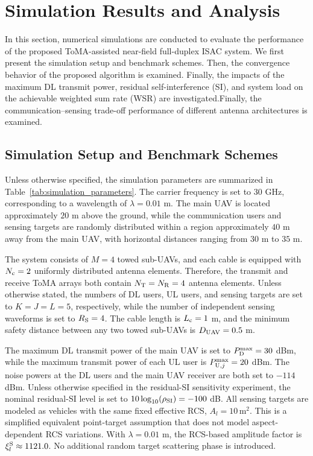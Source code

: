 \documentclass[letterpaper,journal]{IEEEtran}
\begin{document}
\section{Simulation Results and Analysis}
\label{sec:simulation}

In this section, numerical simulations are conducted to evaluate the
performance of the proposed ToMA-assisted near-field full-duplex ISAC
system. We first present the simulation setup and benchmark schemes.
Then, the convergence behavior of the proposed algorithm is examined.
Finally, the impacts of the maximum DL transmit power, residual
self-interference (SI), and system load on the achievable weighted sum
rate (WSR) are investigated.Finally, the communication--sensing trade-off performance of different antenna architectures is examined.

\subsection{Simulation Setup and Benchmark Schemes}
\label{subsec:simulation_setup}

Unless otherwise specified, the simulation parameters are summarized in
Table~\ref{tab:simulation_parameters}. The carrier frequency is set to
$30$ GHz, corresponding to a wavelength of $\lambda=0.01$ m. The main
UAV is located approximately $20$ m above the ground, while the
communication users and sensing targets are randomly distributed within
a region approximately $40$ m away from the main UAV, with horizontal
distances ranging from $30$ m to $35$ m.

The system consists of $M=4$ towed sub-UAVs, and each cable is equipped
with $N_{\rm c}=2$ uniformly distributed antenna elements. Therefore,
the transmit and receive ToMA arrays both contain
$N_{\rm T}=N_{\rm R}=4$ antenna elements. Unless otherwise stated, the
numbers of DL users, UL users, and sensing targets are set to
$K=J=L=5$, respectively, while the number of independent sensing
waveforms is set to $R_{\rm S}=4$. The cable length is
$L_{\rm c}=1$ m, and the minimum safety distance between any two towed
sub-UAVs is $D_{\rm UAV}=0.5$ m.

The maximum DL transmit power of the main UAV is set to
$P_{\rm D}^{\max}=30$ dBm, while the maximum transmit power of each UL
user is $P_{{\rm U},j}^{\max}=20$ dBm. The noise powers at the DL users
and the main UAV receiver are both set to $-114$ dBm. Unless otherwise
specified in the residual-SI sensitivity experiment, the nominal
residual-SI level is set to
$10\log_{10}(\rho_{\rm SI})=-100$ dB. All sensing targets are modeled
as vehicles with the same fixed effective RCS, $A_l=10\,\mathrm{m}^2$.
This is a simplified equivalent point-target assumption that does not
model aspect-dependent RCS variations. With $\lambda=0.01$ m, the
RCS-based amplitude factor is $\xi_l^{\rm S}\approx1121.0$.
No additional random target scattering phase is introduced.
\end{document}

